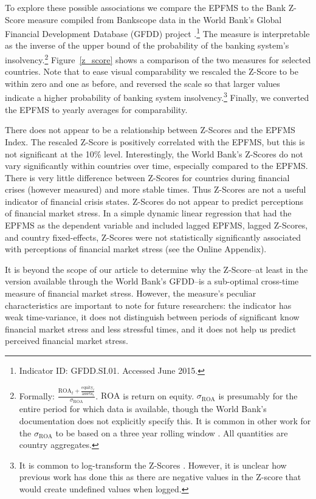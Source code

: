 \documentclass[]{article}
\begin{document}
To explore these possible associations we compare the EPFMS to the Bank Z-Score measure compiled from Bankscope data in the World Bank's Global Financial Development Database (GFDD) project \citep{worldbank2013}.\footnote{Indicator ID: GFDD.SI.01. Accessed June 2015.} The measure is interpretable as the inverse of the upper bound of the probability of the banking system's insolvency.\footnote{Formally: $\frac{\mathrm{ROA}_{t} + \frac{\mathrm{equity}_{t}}{\mathrm{assets}_{t}}}{\sigma_{\mathrm{ROA}}}$. $\mathrm{ROA}$ is return on equity. $\sigma_{\mathrm{ROA}}$ is presumably for the entire period for which data is available, though the World Bank's documentation does not explicitly specify this. It is common in other work for the $\sigma_{\mathrm{ROA}}$ to be based on a three year rolling window \cite[225]{beck2013bank}. All quantities are country aggregates.} Figure~\ref{z_score} shows a comparison of the two measures for selected countries. Note that to ease visual comparability we rescaled the Z-Score to be within zero and one as before, and reversed the scale so that larger values indicate a higher probability of banking system insolvency.\footnote{It is common to log-transform the Z-Scores \cite[225]{beck2013bank}. However, it is unclear how previous work has done this as there are negative values in the Z-score that would create undefined values when logged.} Finally, we converted the EPFMS to yearly averages for comparability.

There does not appear to be a relationship between Z-Scores and the EPFMS Index. The rescaled Z-Score is positively correlated with the EPFMS, but this is not significant at the 10\% level. Interestingly, the World Bank's Z-Scores do not vary significantly within countries over time, especially compared to the EPFMS. There is very little difference between Z-Scores for countries during financial crises (however measured) and more stable times. Thus Z-Scores are not a useful indicator of financial crisis states. Z-Scores do not appear to predict perceptions of financial market stress. In a simple dynamic linear regression that had the EPFMS as the dependent variable and included lagged EPFMS, lagged Z-Scores, and country fixed-effects, Z-Scores were not statistically significantly associated with perceptions of financial market stress (see the Online Appendix).

It is beyond the scope of our article to determine why the Z-Score--at least in the version available through the World Bank's GFDD--is a sub-optimal cross-time measure of financial market stress. However, the measure's peculiar characteristics are important to note for future researchers: the indicator has weak time-variance, it does not distinguish between periods of significant know financial market stress and less stressful times, and it does not help us predict perceived financial market stress.
\end{document}
